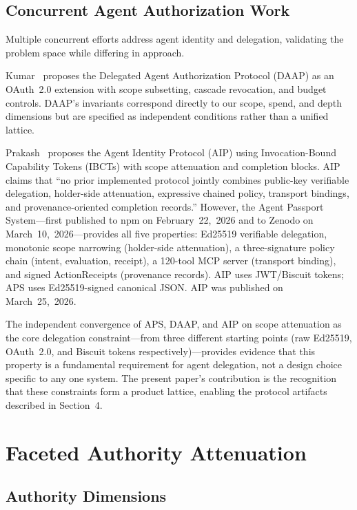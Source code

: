 \documentclass[sigconf,nonacm]{acmart}
\begin{document}
\subsection{Concurrent Agent Authorization Work}

Multiple concurrent efforts address agent identity and delegation, validating the problem
space while differing in approach.

Kumar~\cite{mishra2026} proposes the Delegated Agent Authorization Protocol (DAAP) as an
OAuth~2.0 extension with scope subsetting, cascade revocation, and budget controls.
DAAP's invariants correspond directly to our scope, spend, and depth dimensions but are
specified as independent conditions rather than a unified lattice.

Prakash~\cite{prakash2026} proposes the Agent Identity Protocol (AIP) using
Invocation-Bound Capability Tokens (IBCTs) with scope attenuation and completion blocks.
AIP claims that ``no prior implemented protocol jointly combines public-key verifiable
delegation, holder-side attenuation, expressive chained policy, transport bindings, and
provenance-oriented completion records.'' However, the Agent Passport System---first
published to npm on February~22,~2026 and to Zenodo on March~10,~2026---provides all
five properties: Ed25519 verifiable delegation, monotonic scope narrowing (holder-side
attenuation), a three-signature policy chain (intent, evaluation, receipt), a 120-tool
MCP server (transport binding), and signed ActionReceipts (provenance records). AIP uses
JWT/Biscuit tokens; APS uses Ed25519-signed canonical JSON. AIP was published on
March~25,~2026.

The independent convergence of APS, DAAP, and AIP on scope attenuation as the core
delegation constraint---from three different starting points (raw Ed25519, OAuth~2.0, and
Biscuit tokens respectively)---provides evidence that this property is a fundamental
requirement for agent delegation, not a design choice specific to any one system. The
present paper's contribution is the recognition that these constraints form a product
lattice, enabling the protocol artifacts described in Section~4.

\section{Faceted Authority Attenuation}

\subsection{Authority Dimensions}
\end{document}
